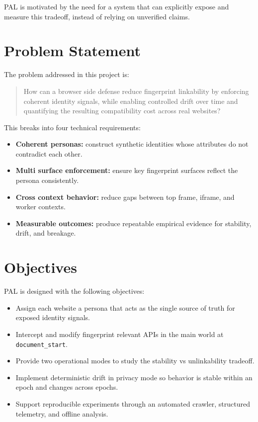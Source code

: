 \documentclass[11pt]{report}
\begin{document}
PAL is motivated by the need for a system that can explicitly expose and measure this tradeoff, instead of relying on unverified claims.

\section{Problem Statement}

The problem addressed in this project is:

\begin{quote}
How can a browser side defense reduce fingerprint linkability by enforcing coherent identity signals, while enabling controlled drift over time and quantifying the resulting compatibility cost across real websites?
\end{quote}

This breaks into four technical requirements:

\begin{itemize}
    \item \textbf{Coherent personas:} construct synthetic identities whose attributes do not contradict each other.
    \item \textbf{Multi surface enforcement:} ensure key fingerprint surfaces reflect the persona consistently.
    \item \textbf{Cross context behavior:} reduce gaps between top frame, iframe, and worker contexts.
    \item \textbf{Measurable outcomes:} produce repeatable empirical evidence for stability, drift, and breakage.
\end{itemize}

\section{Objectives}

PAL is designed with the following objectives:

\begin{itemize}
    \item Assign each website a persona that acts as the single source of truth for exposed identity signals.
    \item Intercept and modify fingerprint relevant APIs in the main world at \texttt{document\_start}.
    \item Provide two operational modes to study the stability vs unlinkability tradeoff.
    \item Implement deterministic drift in privacy mode so behavior is stable within an epoch and changes across epochs.
    \item Support reproducible experiments through an automated crawler, structured telemetry, and offline analysis.
\end{itemize}
\end{document}
